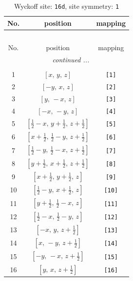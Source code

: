\documentclass[fleqn,8pt]{jsarticle}
\begin{document}
\begin{longtable}{ccc}
\caption{Wyckoff site: {\tt 16d}, site symmetry: {\tt 1}}
 \\
 \hline \hline
No. & position & mapping \\ \hline \endfirsthead

\multicolumn{2}{l}{\tablename\ \thetable{}} \\
 \hline \hline
No. & position & mapping \\ \hline \endhead

 \hline \hline
\multicolumn{2}{r}{\footnotesize\it continued ...} \\ \endfoot

 \hline \hline
\multicolumn{2}{r}{} \\ \endlastfoot

1 & $\left[ x,\, y,\, z \right]$ & {\tt [1]} \\ \hline
2 & $\left[ - y,\, x,\, z \right]$ & {\tt [2]} \\ \hline
3 & $\left[ y,\, - x,\, z \right]$ & {\tt [3]} \\ \hline
4 & $\left[ - x,\, - y,\, z \right]$ & {\tt [4]} \\ \hline
5 & $\left[ \frac{1}{2} - x,\, y + \frac{1}{2},\, z + \frac{1}{2} \right]$ & {\tt [5]} \\ \hline
6 & $\left[ x + \frac{1}{2},\, \frac{1}{2} - y,\, z + \frac{1}{2} \right]$ & {\tt [6]} \\ \hline
7 & $\left[ \frac{1}{2} - y,\, \frac{1}{2} - x,\, z + \frac{1}{2} \right]$ & {\tt [7]} \\ \hline
8 & $\left[ y + \frac{1}{2},\, x + \frac{1}{2},\, z + \frac{1}{2} \right]$ & {\tt [8]} \\ \hline
9 & $\left[ x + \frac{1}{2},\, y + \frac{1}{2},\, z \right]$ & {\tt [9]} \\ \hline
10 & $\left[ \frac{1}{2} - y,\, x + \frac{1}{2},\, z \right]$ & {\tt [10]} \\ \hline
11 & $\left[ y + \frac{1}{2},\, \frac{1}{2} - x,\, z \right]$ & {\tt [11]} \\ \hline
12 & $\left[ \frac{1}{2} - x,\, \frac{1}{2} - y,\, z \right]$ & {\tt [12]} \\ \hline
13 & $\left[ - x,\, y,\, z + \frac{1}{2} \right]$ & {\tt [13]} \\ \hline
14 & $\left[ x,\, - y,\, z + \frac{1}{2} \right]$ & {\tt [14]} \\ \hline
15 & $\left[ - y,\, - x,\, z + \frac{1}{2} \right]$ & {\tt [15]} \\ \hline
16 & $\left[ y,\, x,\, z + \frac{1}{2} \right]$ & {\tt [16]} \\
\end{longtable}
\end{document}
